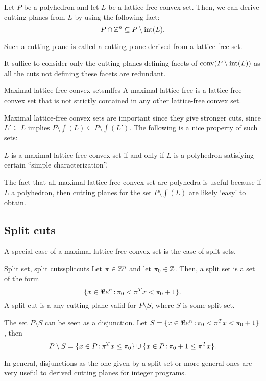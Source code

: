 Let $P$ be a polyhedron and let $L$ be a lattice-free convex set. Then, we can derive cutting planes from $L$ by using the following fact:
$$P\cap {\mathbb{Z}}^n\subseteq P\setminus {\textup{int}}(L).$$

Such a cutting plane is called a cutting plane derived from a lattice-free set. 
\begin{remark}{}{}
It suffice to consider only the cutting planes defining facets of $\textup{conv}(P\setminus{\textup{int}}(L))$ as all the cuts not defining these facets are redundant.
\end{remark}


\begin{definition}{Maximal lattice-free convex sets}{mlfcs}  A maximal lattice-free is a lattice-free convex set that is not strictly contained in any other lattice-free convex set.
\end{definition}


Maximal lattice-free convex sets are important since they give stronger cuts, since $L'\subseteq L$ implies $P\setminus\int(L)\subseteq P\setminus\int(L')$. The following is a nice property of such sets:
\begin{theorem}{}{} $L$ is a maximal lattice-free convex set if and only if $L$ is a polyhedron satisfying certain ``simple characterization''.
\end{theorem}
\begin{remark}{}{}
The fact that all maximal lattice-free convex set are polyhedra is useful because if $L$ a polyhedron, then cutting planes for the set $P\setminus \int(L)$ are likely `easy' to obtain.
\end{remark}

\subsection{Split cuts}

A special case of a maximal lattice-free convex set is the case of split sets.

\begin{definition}{Split set, split cuts}{splitcuts} Let $\pi\in{\mathbb{Z}}^n$ and let $\pi_0\in{\mathbb{Z}}$. Then, a split set is a set of the form
$$\{x\in\Re e^n{\,:\,} \pi_0<\pi^Tx<\pi_0+1\}.$$
A split cut is a any cutting plane valid for $P\setminus S$, where $S$ is some split set. 
\end{definition}


\begin{remark}{}{}
The set $P\setminus S$ can be seen as a disjunction. Let $S=\{x\in\Re e^n{\,:\,} \pi_0<\pi^Tx<\pi_0+1\}$, then
$$P\setminus S=\{x\in P{\,:\,} \pi^Tx\leq \pi_0\} \cup \{x\in P{\,:\,}\pi_0 +1\leq  \pi^Tx\}.$$

In general, disjunctions as the one given by a split set or more general ones are very useful to derived cutting planes for integer programs.
\end{remark}








